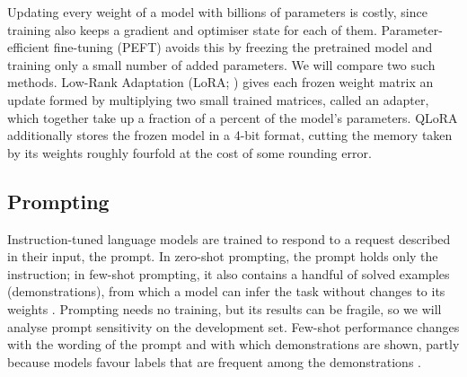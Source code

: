 Updating every weight of a model with billions of parameters is costly, since training also keeps a gradient and optimiser state for each of them. Parameter-efficient fine-tuning (PEFT) avoids this by freezing the pretrained model and training only a small number of added parameters. We will compare two such methods. Low-Rank Adaptation (LoRA; \cite{hu2022lora}) gives each frozen weight matrix an update formed by multiplying two small trained matrices, called an adapter, which together take up a fraction of a percent of the model's parameters. QLoRA \parencite{dettmers2023qlora} additionally stores the frozen model in a 4-bit format, cutting the memory taken by its weights roughly fourfold at the cost of some rounding error.

\subsection{Prompting}
\label{sec:background_prompting}

Instruction-tuned language models are trained to respond to a request described in their input, the prompt. In zero-shot prompting, the prompt holds only the instruction; in few-shot prompting, it also contains a handful of solved examples (demonstrations), from which a model can infer the task without changes to its weights \parencite{brown2020language}. Prompting needs no training, but its results can be fragile, so we will analyse prompt sensitivity on the development set. Few-shot performance changes with the wording of the prompt and with which demonstrations are shown, partly because models favour labels that are frequent among the demonstrations \parencite{zhao2021calibrate}.
